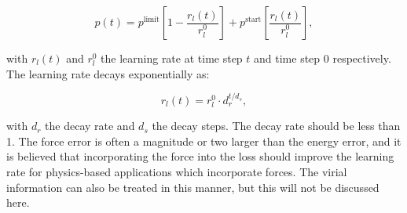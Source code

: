 \begin{equation}
    p(t) = p^{\text{limit}} \left[ 1 - \frac{r_l(t)}{r_l^0} \right]
    + p^{\text{start}} \left[ \frac{r_l(t)}{r_l^0} \right] ,
\end{equation}

with $r_l(t)$ and $r_l^0$ the learning rate at time step $t$ and time step
$0$ respectively. The learning rate decays exponentially as:

$$ r_l(t) = r_l^0 \cdot d_r^{t / d_s} , $$

with $d_r$ the decay rate and $d_s$ the decay steps. The decay
rate should be less than 1. The force error is often a magnitude or two
larger than the energy error, and it is believed that incorporating
the force into the loss should improve the learning rate for
physics-based applications which incorporate forces.
The virial information can also be treated in this manner,
but this will not be discussed here.
